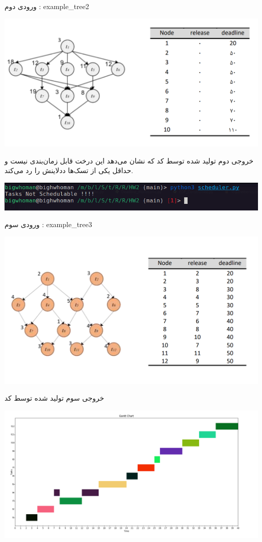 ورودی دوم : example\_tree2 

\includegraphics[scale=0.2]{pics/input2.png}

خروجی دوم تولید شده توسط کد که نشان می‌دهد این درخت قابل زمان‌بندی نیست و حداقل یکی از تسک‌ها ددلاینش را رد می‌کند.

\includegraphics[scale=0.35]{pics/output2.png}

ورودی سوم : example\_tree3 

\includegraphics[scale=0.17]{pics/input3.png}

خروجی سوم تولید شده توسط کد 

\includegraphics[scale=0.3]{pics/output3.png}